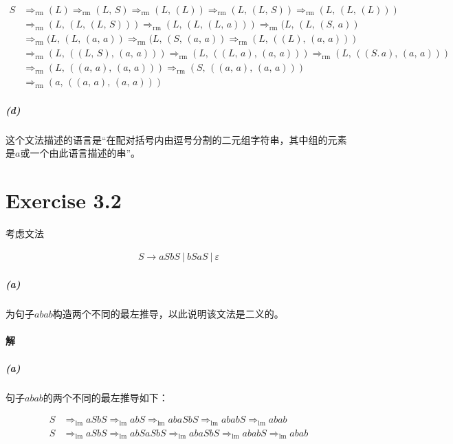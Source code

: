 \documentclass{article}
\begin{document}
\begin{align*}
    S &\Rightarrow_{\text{rm}} (L) \Rightarrow_{\text{rm}} (L,\,S) \Rightarrow_{\text{rm}} (L,\,(L)) \Rightarrow_{\text{rm}} (L,\,(L,\,S)) \Rightarrow_{\text{rm}} (L,\,(L,\,(L))) \\ &\Rightarrow_{\text{rm}} (L,\,(L,\,(L,\,S)))
    \Rightarrow_{\text{rm}} (L,\,(L,\,(L,\,a))) \Rightarrow_{\text{rm}} (L,\,(L,\,(S,\,a)) \\ &\Rightarrow_{\text{rm}} (L,\,(L,\,(a,\,a)) \Rightarrow_{\text{rm}} (L,\,(S,\,(a,\,a))
     \Rightarrow_{\text{rm}} (L,\,((L),\,(a,\,a))) \\
    &\Rightarrow_{\text{rm}} (L,\,((L,\,S),\,(a,\,a)))
    \Rightarrow_{\text{rm}} (L,\,((L,\,a),\,(a,\,a))) \Rightarrow_{\text{rm}} (L,\,((S.\,a),\,(a,\,a))) \\
    &\Rightarrow_{\text{rm}} (L,\,((a,\,a),\,(a,\,a)))
    \Rightarrow_{\text{rm}} (S,\,((a,\,a),\,(a,\,a))) \\
    &\Rightarrow_{\text{rm}} (a,\,((a,\,a),\,(a,\,a)))
\end{align*}

\subparagraph{(d)}
这个文法描述的语言是“在配对括号内由逗号分割的二元组字符串，其中组的元素是$a$或一个由此语言描述的串”。
\\

\section{Exercise 3.2}
考虑文法

\begin{align*}
    S \rightarrow aSbS\ |\ bSaS\ |\ \varepsilon
\end{align*}

\subparagraph{(a)}
为句子$abab$构造两个不同的最左推导，以此说明该文法是二义的。
\\

\paragraph{解}
\subparagraph{(a)}
句子$abab$的两个不同的最左推导如下：

\begin{align*}
    S &\Rightarrow_{\text{lm}} aSbS \Rightarrow_{\text{lm}} abS \Rightarrow_{\text{lm}} abaSbS \Rightarrow_{\text{lm}} ababS \Rightarrow_{\text{lm}} abab \\
    S &\Rightarrow_{\text{lm}} aSbS \Rightarrow_{\text{lm}} abSaSbS \Rightarrow_{\text{lm}} abaSbS \Rightarrow_{\text{lm}} ababS \Rightarrow_{\text{lm}} abab
\end{align*}
\end{document}
